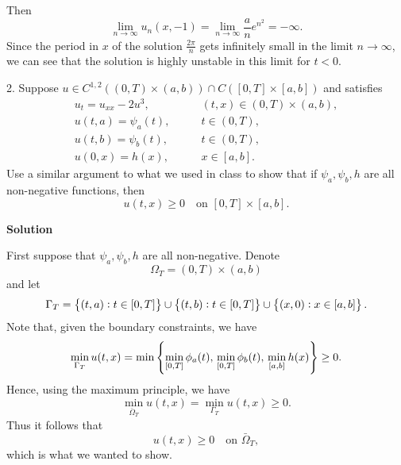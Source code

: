 \documentclass{article}
\begin{document}
Then
%
\begin{equation*}
    \lim_{n \to \infty} u_n(x, -1)
        = \lim_{n \to \infty} \frac{a}{n} e^{n^2}
        = - \infty
    .
\end{equation*}
%
Since the period in $x$ of the solution $\frac{2 \pi}{n}$ gets
infinitely small in the limit $n \to \infty$, we can see that the
solution is highly unstable in this limit for $t < 0$.

\newpage

2. Suppose
$u \in C^{1, 2}((0, T) \times (a, b)) \cap C([0, T] \times [a, b])$ and satisfies
%
\begin{align*}
    u_t = u_{xx} - 2u^3, &\qquad (t, x) \in (0, T) \times (a, b), \\
    u(t, a) = \psi_a(t), &\qquad t \in (0, T), \\
    u(t, b) = \psi_b(t), &\qquad t \in (0, T), \\
    u(0, x) = h(x), &\qquad x \in [a, b].
\end{align*}
%
Use a similar argument to what we used in class to show that if
$\psi_a, \psi_b, h$ are all non-negative functions, then
%
\begin{equation*}
    u(t, x) \geq 0 \quad \text{on } [0, T] \times [a, b]
    .
\end{equation*}

\textbf{Solution}

First suppose that $\psi_a, \psi_b, h$ are all non-negative. Denote
\[\Omega_T = (0, T) \times (a, b)\] and let
%
\begin{equation*}
    \Gamma_T = \cbr{(t, a): t \in [0, T]}
                \cup \cbr{(t, b): t \in [0, T]}
                \cup \cbr{(x, 0): x \in [a, b]}
    .
\end{equation*}
%
Note that, given the boundary constraints, we have
%
\begin{equation*}
    \min_{\Gamma_T} u(t, x)
        = \min \cbr{
            \min_{[0, T]} \phi_a(t), \,
            \min_{[0, T]} \phi_b(t), \,
            \min_{[a, b]} h(x)
          }
        \geq 0
        .
\end{equation*}
%
Hence, using the maximum principle, we have
%
\begin{equation*}
    \min_{\bar{\Omega}_T} u(t, x) = \min_{\Gamma_T} u(t, x) \geq 0
    .
\end{equation*}
%
Thus it follows that
%
\begin{equation*}
    u(t, x) \geq 0 \quad \text{on } \bar{\Omega}_T
    ,
\end{equation*}
%
which is what we wanted to show.
\end{document}
